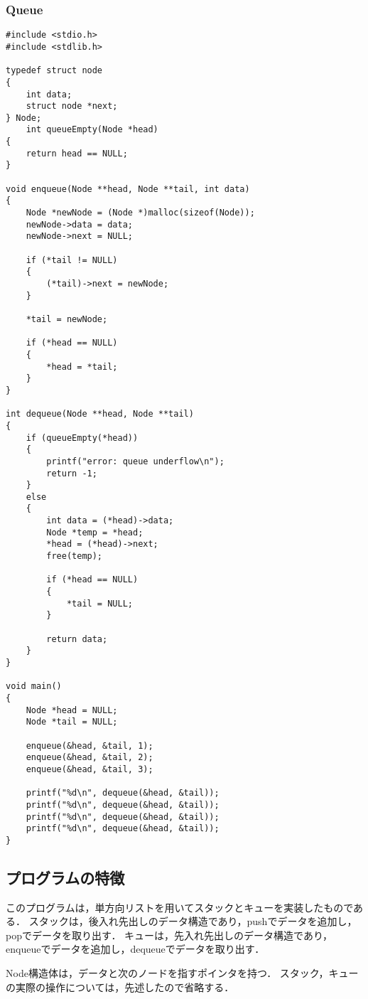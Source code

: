 \documentclass{ltjsarticle}
\begin{document}
\subsubsection{Queue}
\begin{lstlisting}[frame=single, lineskip=-5pt]
#include <stdio.h>
#include <stdlib.h>

typedef struct node
{
    int data;
    struct node *next;
} Node;
    int queueEmpty(Node *head)
{
    return head == NULL;
}

void enqueue(Node **head, Node **tail, int data)
{
    Node *newNode = (Node *)malloc(sizeof(Node));
    newNode->data = data;
    newNode->next = NULL;

    if (*tail != NULL)
    {
        (*tail)->next = newNode;
    }

    *tail = newNode;

    if (*head == NULL)
    {
        *head = *tail;
    }
}

int dequeue(Node **head, Node **tail)
{
    if (queueEmpty(*head))
    {
        printf("error: queue underflow\n");
        return -1;
    }
    else
    {
        int data = (*head)->data;
        Node *temp = *head;
        *head = (*head)->next;
        free(temp);

        if (*head == NULL)
        {
            *tail = NULL;
        }

        return data;
    }
}

void main()
{
    Node *head = NULL;
    Node *tail = NULL;

    enqueue(&head, &tail, 1);
    enqueue(&head, &tail, 2);
    enqueue(&head, &tail, 3);

    printf("%d\n", dequeue(&head, &tail));
    printf("%d\n", dequeue(&head, &tail));
    printf("%d\n", dequeue(&head, &tail));
    printf("%d\n", dequeue(&head, &tail));
}
\end{lstlisting}

\subsection{プログラムの特徴}
このプログラムは，単方向リストを用いてスタックとキューを実装したものである．
スタックは，後入れ先出しのデータ構造であり，pushでデータを追加し，popでデータを取り出す．
キューは，先入れ先出しのデータ構造であり，enqueueでデータを追加し，dequeueでデータを取り出す．

Node構造体は，データと次のノードを指すポインタを持つ．
スタック，キューの実際の操作については，先述したので省略する．
\end{document}
